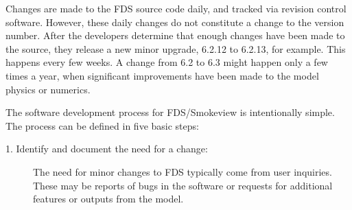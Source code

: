 \documentclass[11pt]{book}
\begin{document}
Changes are made to the FDS source code daily, and tracked via revision control software. However, these daily changes do not constitute a change to the version number. After the developers determine that enough changes have been made to the source, they release a new minor upgrade, 6.2.12 to 6.2.13, for example. This happens every few weeks. A change from 6.2 to 6.3 might happen only a few times a year, when significant improvements have been made to the model physics or numerics.

The software development process for FDS/Smokeview is intentionally simple. The process can be defined in five basic steps:

\begin{description}
\item [1. Identify and document the need for a change:] The need for minor changes to FDS typically come from user inquiries. These may be reports of bugs in the software or requests for additional features or outputs from the model.


\end{description}
\end{document}
